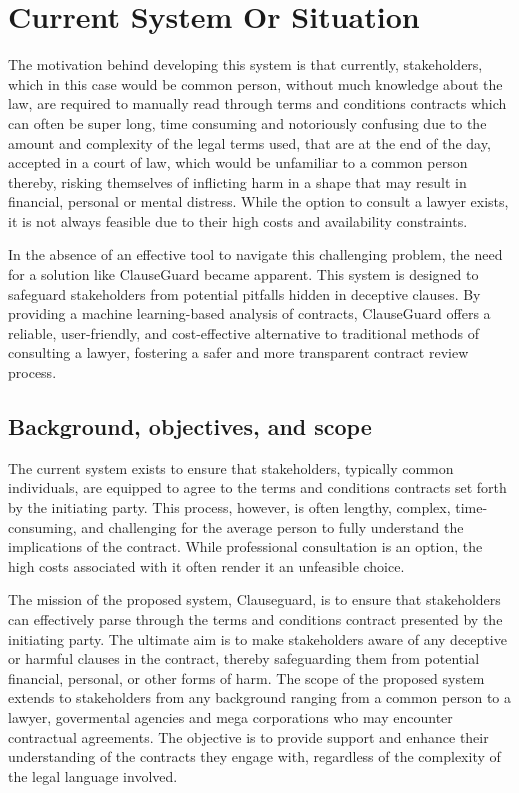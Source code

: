 \chapter{Current System Or Situation \\
\label{Chapter::Current System Or Situation}}
The motivation behind developing this system is that currently, stakeholders, which in this case would be common person, without much knowledge about the law, are required to manually read through terms and conditions contracts which can often be super long, time consuming and notoriously confusing due to the amount and complexity of the legal terms used, that are at the end of the day, accepted in a court of law, which would be unfamiliar to a common person thereby, risking themselves of inflicting harm in a shape that may result in financial, personal or mental distress. While the option to consult a lawyer exists, it is not always feasible due to their high costs and availability constraints.

In the absence of an effective tool to navigate this challenging problem, the need for a solution like ClauseGuard became apparent. This system is designed to safeguard stakeholders from potential pitfalls hidden in deceptive clauses. By providing a machine learning-based analysis of contracts, ClauseGuard offers a reliable, user-friendly, and cost-effective alternative to traditional methods of consulting a lawyer, fostering a safer and more transparent contract review process.  

\section{Background, objectives, and scope \label{Section::Background,objectives and scope} }
The current system exists to ensure that stakeholders, typically common individuals, are equipped to agree to the terms and conditions contracts set forth by the initiating party. This process, however, is often lengthy, complex, time-consuming, and challenging for the average person to fully understand the implications of the contract. While professional consultation is an option, the high costs associated with it often render it an unfeasible choice.

The mission of the proposed system, Clauseguard, is to ensure that stakeholders can effectively parse through the terms and conditions contract presented by the initiating party. The ultimate aim is to make stakeholders aware of any deceptive or harmful clauses in the contract, thereby safeguarding them from potential financial, personal, or other forms of harm.
 The scope of the proposed system extends to stakeholders from any background ranging from a common person to a lawyer, govermental agencies and mega corporations who may encounter contractual agreements. The objective is to provide support and enhance their understanding of the contracts they engage with, regardless of the complexity of the legal language involved. 



